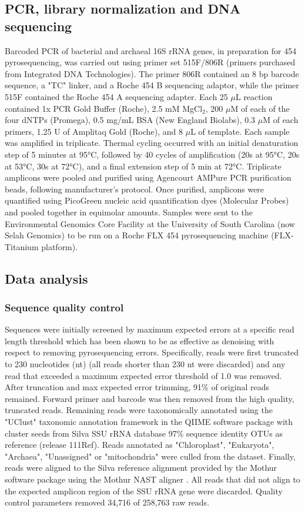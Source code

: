  \subsection{PCR, library normalization and DNA sequencing} 
 Barcoded PCR of bacterial and archaeal 16S
 rRNA genes, in preparation for 454 pyrosequencing, was carried out using
 primer set 515F/806R \citep{21349862} (primers purchased from Integrated DNA
 Technologies).  The primer 806R contained an 8 bp
 barcode sequence, a "TC" linker, and a Roche 454 B sequencing adaptor, while
 the primer 515F contained the Roche 454 A sequencing adapter. Each 25 $\mu$L
 reaction contained 1x PCR Gold Buffer (Roche), 2.5 mM MgCl$_{2}$, 200 $\mu$M
 of each of the four dNTPs (Promega), 0.5 mg/mL BSA (New England Biolabs), 0.3
 $\mu$M of each primers, 1.25 U of Amplitaq Gold (Roche), and 8 $\mu$L of
 template. Each sample was amplified in triplicate. Thermal cycling occurred
 with an initial denaturation step of 5 minutes at 95°C, followed by 40 cycles
 of amplification (20s at 95°C, 20s at 53°C, 30s at 72°C), and a final
 extension step of 5 min at 72°C. Triplicate amplicons were pooled and purified
 using Agencourt AMPure PCR purification beads, following manufacturer’s
 protocol. Once purified, amplicons were quantified using PicoGreen nucleic acid
 quantification dyes (Molecular Probes) and pooled together in equimolar
 amounts. Samples were sent to the Environmental Genomics Core Facility at the
 University of South Carolina (now Selah Genomics) to be run on a Roche FLX 454
 pyrosequencing machine (FLX-Titanium platform). 

\subsection{Data analysis} 
\subsubsection{Sequence quality control}
Sequences were initially screened by maximum expected errors at a specific read
length threshold \citep{23955772} which has been shown to be as effective as
denoising with respect to removing pyrosequencing errors. Specifically, reads
were first truncated to 230 nucleotides (nt) (all reads shorter than 230 nt
were discarded) and any read that exceeded a maximum expected error threshold
of 1.0 was removed. After truncation and max expected error trimming, 91\% of
original reads remained.  Forward primer and barcode was then removed from the
high quality, truncated reads.  Remaining reads were taxonomically annotated
using the "UClust" taxonomic annotation framework in the QIIME software package
\citep{20383131, 20709691} with cluster seeds from Silva SSU rRNA database
\citep{17947321} 97\% sequence identity OTUs as reference (release 111Ref).
Reads annotated as "Chloroplast", "Eukaryota", "Archaea", "Unassigned" or
"mitochondria" were culled from the dataset. Finally, reads were aligned to the
Silva reference alignment provided by the Mothur software package
\citep{19801464} using the Mothur NAST aligner \citep{16845035}. All reads that
did not align to the expected amplicon region of the SSU rRNA gene were
discarded. Quality control parameters removed 34,716 of 258,763 raw reads.

